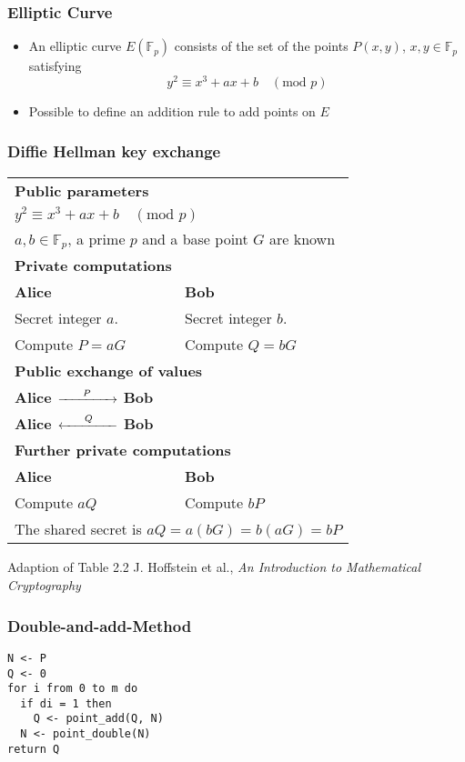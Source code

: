 \begin{frame}
  \frametitle{Elliptic Curve}
  \begin{itemize}
  \item{
  An elliptic curve $E(\mathbb{F}_p)$ consists of the set of the points $P(x,y)$, $x,y \in \mathbb{F}_p$ satisfying
  \begin{equation*}
  y^2 \equiv x^3 + ax + b \quad (\text{mod } p)
  \end{equation*}
  }
  \item{
  Possible to define an addition rule to add points on $E$
  }
  \end{itemize}
\end{frame}
\begin{frame}[shrink=20]
  \frametitle{Diffie Hellman key exchange}
  \begin{table}
  \begin{tabular}{|p{5cm} p{5cm} |}
      \hline			
      \multicolumn{2}{|p{10cm}|}{\rule{0em}{1.2em}\bf{Public parameters}}\\
      \multicolumn{2}{|p{10cm}|}{$ y^2 \equiv x^3 + ax + b \quad (\text{mod } p)$}\\
      \multicolumn{2}{|p{10cm}|}{$a,b \in \mathbb{F}_p$, a prime $p$ and a base point $G$ are known}\\
      \hline
      \multicolumn{2}{|p{10cm}|}{\rule{0em}{1.2em}\bf{Private computations}}\\
      \bf{\small{Alice}} & \bf{\small{Bob}}\\
      Secret integer $a$. & Secret integer $b$.\\
      Compute $P = aG$ &  Compute $Q = bG$ \\
      \hline
      \multicolumn{2}{|p{10cm}|}{\rule{0em}{1.2em}\bf{Public exchange of values}}\\
      \multicolumn{2}{|p{10cm}|}{
      \bf{\small{Alice}} $\xrightarrow{\hspace*{0.6cm}P\hspace*{0.6cm}}$ \bf{\small{Bob}}
      } \\
      \multicolumn{2}{|p{10cm}|}{
      \bf{\small{Alice}} $\xleftarrow{\hspace*{0.6cm}Q\hspace*{0.6cm}}$ \bf{\small{Bob}}
      }\\
      \hline
      \multicolumn{2}{|p{10cm}|}{\rule{0em}{1.2em}\bf{Further private computations}}\\
      \bf{\small{Alice}} & \bf{\small{Bob}}\\
      Compute $aQ$ & Compute $bP$ \\
      \multicolumn{2}{|p{10cm}|}{
      The shared secret is $aQ = a(bG) = b(aG) = bP$}\\ \hline
    \end{tabular}
    \end{table}
    \vfill
    \tiny{Adaption of Table 2.2 J. Hoffstein et al., \emph{An Introduction to Mathematical Cryptography}}
\end{frame}
\begin{frame}[fragile]
\frametitle{Double-and-add-Method}
\begin{lstlisting}[frame=single]  % Start your code-block
N <- P
Q <- 0
for i from 0 to m do
  if di = 1 then
    Q <- point_add(Q, N)
  N <- point_double(N)
return Q
\end{lstlisting}
\end{frame}
